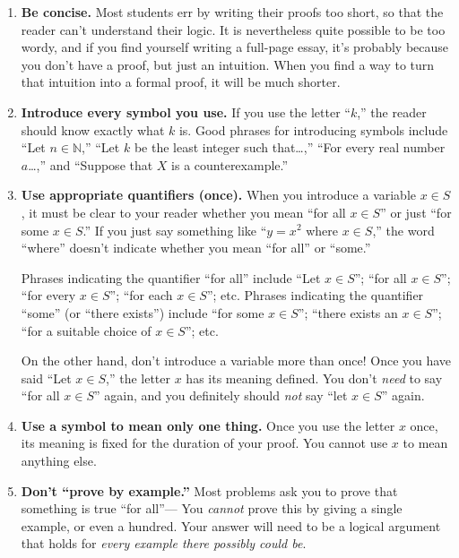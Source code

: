 \begin{enumerate}
\item \textbf{Be concise.}
	Most students err by writing their proofs too short,
	so that the reader can't understand their logic.
	It is nevertheless quite possible to be too wordy,
	and if you find yourself writing a full-page essay,
	it's probably because you don't have a proof,
	but just an intuition.
	When you find a way to turn that intuition into a formal proof,
	it will be much shorter.

\item \textbf{Introduce every symbol you use.}
	If you use the letter ``$k$,'' the reader should know exactly what $k$ is.
	Good phrases for introducing symbols include
	  ``Let $n\in \mathbb{N}$,''
	  ``Let $k$ be the least integer such that\ldots,''
	  ``For every real number $a$\ldots,''
	  and
	  ``Suppose that $X$ is a counterexample.''
	  
\item \textbf{Use appropriate quantifiers (once).}
	When you introduce a variable $x\in S$, 
	it must be clear to your reader whether you mean ``for all $x\in S$''
	or just ``for some $x\in S$.''
	If you just say something like ``$y=x^2$ where $x\in S$,''
	the word ``where'' doesn't indicate whether you mean ``for all'' or ``some.''
	
	Phrases indicating the quantifier ``for all'' include 
	   ``Let $x\in S$'';
	   ``for all $x\in S$'';
	   ``for every $x\in S$'';
	   ``for each $x\in S$''; etc.
	Phrases indicating the quantifier ``some'' (or ``there exists'') include
	   ``for some $x\in S$'';
	   ``there exists an $x\in S$'';
	   ``for a suitable choice of $x\in S$''; etc.
	
	On the other hand, don't introduce a variable more than once!
	Once you have said ``Let $x\in S$,''
	the letter $x$ has its meaning defined.
	You don't \emph{need} to say ``for all $x\in S$'' again,
	and you definitely should \emph{not} say ``let $x\in S$'' again.

\item \textbf{Use a symbol to mean only one thing.}
	Once you use the letter $x$ once,
	its meaning is fixed for the duration of your proof.
	You cannot use $x$ to mean anything else.

\item \textbf{Don't ``prove by example.''}\label{pfbyexample}
	Most problems ask you to prove that something is true ``for all''---%
	You \emph{cannot} prove this by giving a single example, or even a hundred.
	Your answer will need to be a logical argument that holds for \emph{every example there possibly could be}.
	

\end{enumerate}
